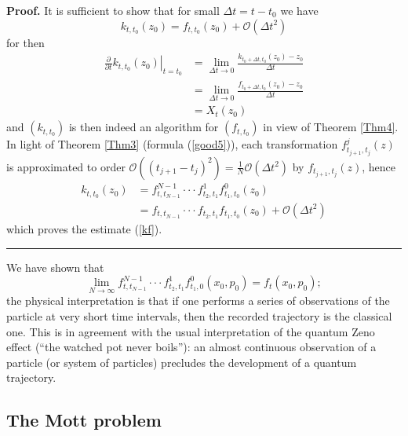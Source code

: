 \documentclass[12pt]{article}%
\newenvironment{proof}[1][Proof]{\noindent\textbf{#1.} }{\ \rule{0.5em}{0.5em}}
\begin{document}
\begin{proof}
It is sufficient to show that for small $\Delta t=t-t_{0}$ we have%
\begin{equation}
k_{t,t_{0}}(z_{0})=f_{t,t_{0}}(z_{0})+\mathcal{O}(\Delta t^{2}) \label{kf}%
\end{equation}
for then
\begin{align*}
\left.  \frac{\partial}{\partial t}k_{t,t_{0}}(z_{0})\right\vert _{t=t_{0}}
&  =\lim_{\Delta t\rightarrow0}\frac{k_{t_{0}+\Delta t,t_{0}}(z_{0})-z_{0}%
}{\Delta t}\\
&  =\lim_{\Delta t\rightarrow0}\frac{f_{t_{0}+\Delta t,t_{0}}(z_{0})-z_{0}%
}{\Delta t}\\
&  =X_{t}(z_{0})
\end{align*}
and $(k_{t,t_{0}})$ is then indeed an algorithm for $(f_{t,t_{0}})$ in view of
Theorem \ref{Thm4}. In light of Theorem \ref{Thm3} (formula (\ref{good5})),
each transformation $f_{t_{j+1},t_{j}}^{j}(z)$ is approximated to order
$\mathcal{O}((t_{j+1}-t_{j})^{2})=\frac{1}{N}\mathcal{O}(\Delta t^{2})$ by
$f_{t_{j+1},t_{j}}(z)$, hence
\begin{align*}
k_{t,t_{0}}(z_{0})  &  =f_{t,t_{N-1}}^{N-1}\cdot\cdot\cdot f_{t_{2},t_{1}}%
^{1}f_{t_{1},t_{0}}^{0}(z_{0})\\
&  =f_{t,t_{N-1}}\cdot\cdot\cdot f_{t_{2},t_{1}}f_{t_{1},t_{0}}(z_{0}%
)+\mathcal{O}(\Delta t^{2})
\end{align*}
which proves the estimate (\ref{kf}).
\end{proof}

We have shown that
\[
\lim_{N\rightarrow\infty}f_{t,t_{N-1}}^{N-1}\cdot\cdot\cdot f_{t_{2},t_{1}%
}^{1}f_{t_{1},0}^{0}(x_{0},p_{0})=f_{t}(x_{0},p_{0});
\]
the physical interpretation is that if one performs a series of observations
of the particle at very short time intervals, then the recorded trajectory is
the classical one. This is in agreement with the usual interpretation of the
quantum Zeno effect (\textquotedblleft the watched pot never
boils\textquotedblright): an almost continuous observation of a particle (or
system of particles) precludes the development of a quantum trajectory.

\subsection{The Mott problem}
\end{document}
